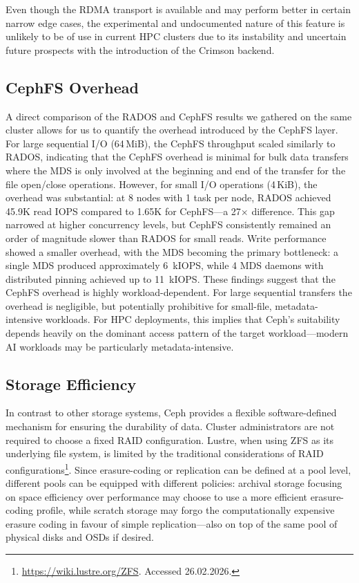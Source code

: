 Even though the \ac{RDMA} transport is available and may perform better in certain narrow edge cases, the experimental and undocumented nature of this feature is unlikely to be of use in current \ac{HPC} clusters due to its instability and uncertain future prospects with the introduction of the Crimson backend.

\subsection{\acs{CephFS} Overhead}

A direct comparison of the \ac{RADOS} and \ac{CephFS} results we gathered on the same cluster allows for us to quantify the overhead introduced by the \ac{CephFS} layer. For large sequential \ac{I/O} (64\,MiB), the \ac{CephFS} throughput scaled similarly to \ac{RADOS}, indicating that the \ac{CephFS} overhead is minimal for bulk data transfers where the \ac{MDS} is only involved at the beginning and end of the transfer for the file open/close operations. However, for small \ac{I/O} operations (4\,KiB), the overhead was substantial: at 8 nodes with 1 task per node, \ac{RADOS} achieved 45.9K read \ac{IOPS} compared to 1.65K for \ac{CephFS}---a 27$\times$ difference. This gap narrowed at higher concurrency levels, but \ac{CephFS} consistently remained an order of magnitude slower than \ac{RADOS} for small reads. Write performance showed a smaller overhead, with the \ac{MDS} becoming the primary bottleneck: a single \ac{MDS} produced approximately 6\ k\acs{IOPS}, while 4 \ac{MDS} daemons with distributed pinning achieved up to 11\ k\acs{IOPS}. These findings suggest that the \ac{CephFS} overhead is highly workload-dependent. For large sequential transfers the overhead is negligible, but potentially prohibitive for small-file, metadata-intensive workloads. For \ac{HPC} deployments, this implies that Ceph's suitability depends heavily on the dominant access pattern of the target workload---modern \ac{AI} workloads may be particularly metadata-intensive.

\subsection{Storage Efficiency}

In contrast to other storage systems, Ceph provides a flexible software-defined mechanism for ensuring the durability of data. Cluster administrators are not required to choose a fixed \ac{RAID} configuration. Lustre, when using ZFS as its underlying file system, is limited by the traditional considerations of \ac{RAID} configurations\footnote{\url{https://wiki.lustre.org/ZFS}. Accessed 26.02.2026.}. Since erasure-coding or replication can be defined at a pool level, different pools can be equipped with different policies: archival storage focusing on space efficiency over performance may choose to use a more efficient erasure-coding profile, while scratch storage may forgo the computationally expensive erasure coding in favour of simple replication---also on top of the same pool of physical disks and \acp{OSD} if desired.


